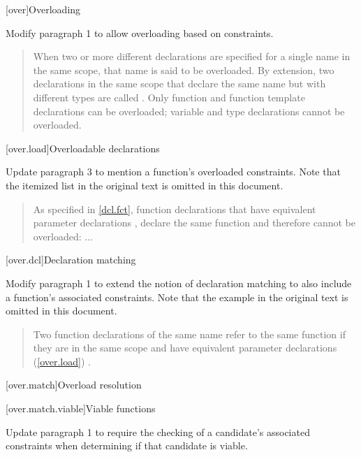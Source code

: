 
\setcounter{chapter}{12}
[over]{Overloading}

Modify paragraph 1 to allow overloading based on constraints.

\begin{quote}
\pnum
When two or more different declarations are specified for a single name 
in the same scope, that name is said to be overloaded. By extension, two 
declarations in the same scope that declare the same name but with
different types 
are called . Only function and function 
template declarations can be overloaded; variable and type declarations 
cannot be overloaded.
\end{quote}

[over.load]{Overloadable declarations}

Update paragraph 3 to mention a function's overloaded constraints. 
Note that the itemized list in the original text is omitted in this
document.

\begin{quote}
\setcounter{Paras}{2}
\pnum
\enternote
As specified in \ref{dcl.fct}, function declarations that have equivalent 
parameter declarations , declare the same function and therefore cannot be 
overloaded: ...
\exitnote
\end{quote}


[over.dcl]{Declaration matching}

Modify paragraph 1 to extend the notion of declaration matching to
also include a function's associated constraints. Note that the
example in the original text is omitted in this document.

\begin{quote}
Two function declarations of the same name refer to the same function if 
they are in the same scope and have equivalent parameter declarations 
(\ref{over.load}) .
\end{quote}


\setcounter{section}{2}
[over.match]{Overload resolution}


\setcounter{subsection}{1}
[over.match.viable]{Viable functions}

Update paragraph 1 to require the checking of a candidate's associated
constraints when determining if that candidate is viable.

